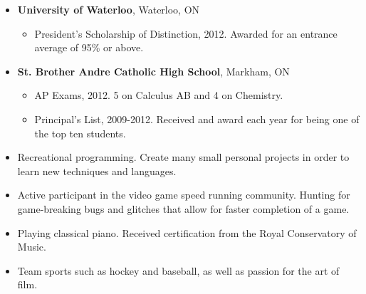 \documentclass[10pt,letterpaper]{article}
\begin{document}
\begin{itemize}
\parskip=0.1em
\item\textbf{University of Waterloo}, Waterloo, ON
\begin{itemize}
\item President's Scholarship of Distinction, 2012.  Awarded for an entrance average of 95\% or above.
\end{itemize}
\item\textbf{St. Brother Andre Catholic High School}, Markham, ON
\begin{itemize}
\item AP Exams, 2012.  5 on Calculus AB and 4 on Chemistry.
\item Principal's List, 2009-2012.  Received and award each year for being one of the top ten students.
\end{itemize}
\end{itemize}

\begin{itemize}
\parskip=0.1em
\item Recreational programming.  Create many small personal projects in order to learn new techniques and languages.
\item Active participant in the video game speed running community.  Hunting for game-breaking bugs and glitches that allow for faster completion of a game.
\item Playing classical piano.  Received certification from the Royal Conservatory of Music.
\item Team sports such as hockey and baseball, as well as passion for the art of film.
\end{itemize}
\end{document}
